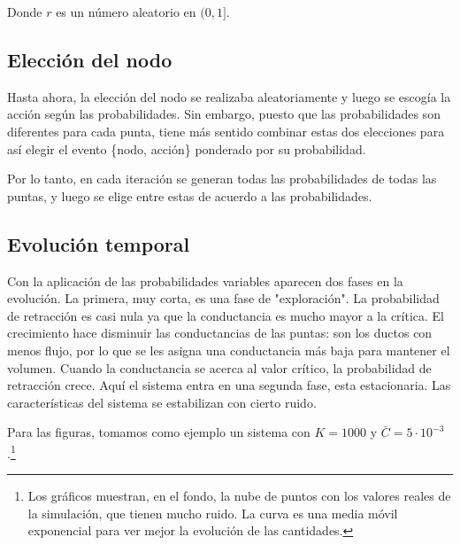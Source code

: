 \documentclass{article}
\begin{document}
Donde $r$ es un número aleatorio en $(0,1]$.

\subsection{Elección del nodo}

Hasta ahora, la elección del nodo se realizaba aleatoriamente y luego se escogía la acción según las probabilidades. Sin embargo, puesto que las probabilidades son diferentes para cada punta, tiene más sentido combinar estas dos elecciones para así elegir el evento \{nodo, acción\} ponderado por su probabilidad.

Por lo tanto, en cada iteración se generan todas las probabilidades de todas las puntas, y luego se elige entre estas de acuerdo a las probabilidades.

\subsection{Evolución temporal}

Con la aplicación de las probabilidades variables aparecen dos fases en la evolución. La primera, muy corta, es una fase de "exploración". La probabilidad de retracción es casi nula ya que la conductancia es mucho mayor a la crítica. El crecimiento hace disminuir las conductancias de las puntas: son los ductos con menos flujo, por lo que se les asigna una conductancia más baja para mantener el volumen. Cuando la conductancia se acerca al valor crítico, la probabilidad de retracción crece. Aquí el sistema entra en una segunda fase, esta estacionaria. Las características del sistema se estabilizan con cierto ruido.

Para las figuras, tomamos como ejemplo un sistema con $K = 1000$ y $\bar{C} = 5\cdot10^{-3}$.\footnote{Los gráficos muestran, en el fondo, la nube de puntos con los valores reales de la simulación, que tienen mucho ruido. La curva es una media móvil exponencial para ver mejor la evolución de las cantidades.}
\end{document}
